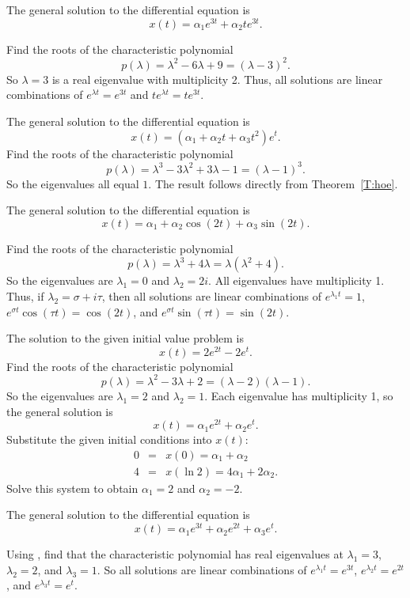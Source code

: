 \documentclass{ximera}
\begin{document}
 \ans The general solution to the differential equation is
\[
x(t) = \alpha_1e^{3t} + \alpha_2te^{3t}.
\]

\soln Find the roots of the characteristic polynomial
\[
p(\lambda) = \lambda^2 - 6\lambda + 9 = (\lambda - 3)^2.
\]
So $\lambda = 3$ is a real eigenvalue with multiplicity 2.  Thus, all
solutions are linear combinations of $e^{\lambda t} = e^{3t}$ and
$te^{\lambda t} = te^{3t}$.

 \ans The general solution to the differential equation is
\[
x(t) = (\alpha_1+\alpha_2 t + \alpha_3 t^2) e^t.
\]
\soln Find the roots of the characteristic polynomial
\[
p(\lambda) = \lambda^3 - 3\lambda^2 + 3\lambda - 1 = (\lambda - 1)^3.
\]
So the eigenvalues all equal $1$.  The result follows directly from
Theorem~\ref{T:hoe}.

 \ans The general solution to the differential equation is
\[
x(t) = \alpha_1 + \alpha_2\cos(2t) + \alpha_3\sin(2t).
\]

\soln Find the roots of the characteristic polynomial
\[
p(\lambda) = \lambda^3 + 4\lambda = \lambda(\lambda^2 + 4).
\]
So the eigenvalues are $\lambda_1 = 0$ and $\lambda_2 = 2i$.  All
eigenvalues have multiplicity 1.  Thus, if $\lambda_2 = \sigma + i\tau$, then
all solutions are linear combinations of $e^{\lambda_1 t} = 1$,
$e^{\sigma t}\cos(\tau t) = \cos(2t)$, and $e^{\sigma t}\sin(\tau t)
= \sin(2t)$.

 \ans The solution to the given initial value problem is
\[
x(t) = 2e^{2t} - 2e^t.
\]
\soln Find the roots of the characteristic polynomial
\[
p(\lambda) = \lambda^2 - 3\lambda + 2 = (\lambda - 2)(\lambda - 1).
\]
So the eigenvalues are $\lambda_1 = 2$ and $\lambda_2 = 1$.  Each eigenvalue
has multiplicity 1, so the general solution is
\[
x(t) = \alpha_1e^{2t} + \alpha_2e^t.
\]
Substitute the given initial conditions into $x(t)$:
\[
\begin{array}{rcl}
0 & = & x(0) = \alpha_1 + \alpha_2 \\
4 & = & x(\ln 2) = 4\alpha_1 + 2\alpha_2.
\end{array}
\]
Solve this system to obtain $\alpha_1 = 2$ and $\alpha_2 = -2$.

 \ans The general solution to the differential equation is
\[
x(t) = \alpha_1e^{3t} + \alpha_2e^{2t} + \alpha_3e^t.
\]

\soln Using \Matlab, find that the characteristic polynomial has real
eigenvalues at $\lambda_1 = 3$, $\lambda_2 = 2$, and $\lambda_3 = 1$.  So
all solutions are linear combinations of $e^{\lambda_1 t} = e^{3t}$,
$e^{\lambda_2 t} = e^{2t}$, and $e^{\lambda_3 t} = e^t$.
\end{document}
